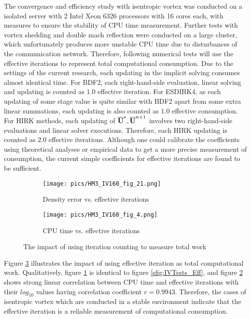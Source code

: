 \documentclass[preprint,12pt]{elsarticle}
\begin{document}
The convergence and efficiency study with isentropic vortex was 
conducted on a isolated server with 2 Intel Xeon 6326 processors with 
16 cores each, with measures to ensure the stability of CPU time measurement.
Further tests with vortex shedding and double mach reflection 
were conducted on a large cluster, which unfortunately produces more
unstable CPU time due to disturbances of the communication network.
Therefore, following numerical tests will use the effective iterations 
to represent total computational consumption.
Due to the settings of the current research, each updating in 
the implicit solving consumes almost identical time.
For BDF2, each right-hand-side evaluation, linear solving and updating 
is counted as $1.0$ effective iteration. 
For ESDIRK4, as each updating of some stage value is quite similar with 
BDF2 apart from some extra linear summations, each updating is also 
counted as $1.0$ effective consumption. 
For HIRK methods, each updating of $\overline{\mathbf{U}}^*,\overline{\mathbf{U}}^{n+1}$ 
involves two right-hand-side evaluations and linear solver executions.
Therefore, each HIRK updating is counted as $2.0$ effective iterations.
Although one could calibrate the coefficients using theoretical analyses or 
empirical data to get a more precise measurement of consumption, 
the current simple coefficients for effective iterations are found to 
be sufficient.

\begin{figure}[htbp]
    \centering
    \begin{subfigure}{0.5\textwidth}
        \texttt{[image: pics/HM3\_IV160\_fig\_21.png]}
        \caption[]{Density error vs. effective iterations }
        \label{sfig:IVTests2_EffIt}
    \end{subfigure}\hfill
    \begin{subfigure}{0.5\textwidth}
        \texttt{[image: pics/HM3\_IV160\_fig\_4.png]}
        \caption[]{CPU time vs. effective iterations}
        \label{sfig:IVTests2_CPUVEffIt}
    \end{subfigure}
    \caption[]{The impact of using iteration counting to measure total work}
    \label{fig:IVTests2}
\end{figure}

Figure \ref{fig:IVTests2} illustrates the impact of using effective iteration
as total computational work. Qualitatively, figure \ref{sfig:IVTests2_EffIt}
is identical to figure \ref{sfig:IVTests_Eff}, 
and figure  \ref{sfig:IVTests2_CPUVEffIt} shows strong linear correlation 
between CPU time and effective iterations with their 
$log_{10}$ values having correlation coefficient $r=0.9943$. 
Therefore, the cases of isentropic vortex which are conducted in 
a stable environment indicate that the effective iteration is 
a reliable measurement of computational consumption.
\end{document}
